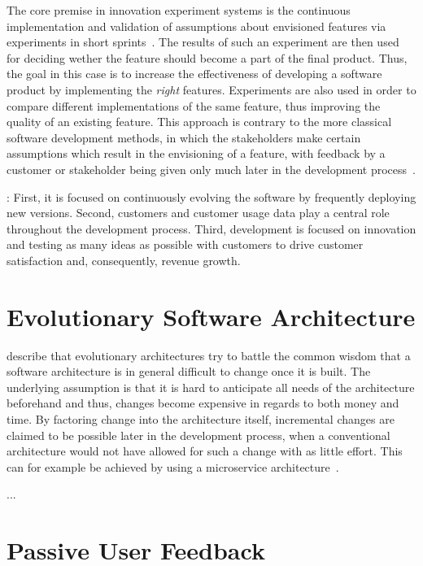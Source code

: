The core premise in innovation experiment systems is the continuous implementation and validation of assumptions about envisioned features via experiments in short sprints~\cite{Bosch2014}.
The results of such an experiment are then used for deciding wether the feature should become a part of the final product.
Thus, the goal in this case is to increase the effectiveness of developing a software product by implementing the \emph{right} features.
Experiments are also used in order to compare different implementations of the same feature, thus improving the quality of an existing feature.
This approach is contrary to the more classical software development methods, in which the stakeholders make certain assumptions which result in the envisioning of a feature, with feedback by a customer or stakeholder being given only much later in the development process~\cite{Bosch2012}.

\cite{Bosch2012}: First, it is focused on continuously evolving the software by frequently deploying new versions. Second, customers and customer usage data play a central role throughout the development process. Third, development is focused on innovation and testing as many ideas as possible with customers to drive customer satisfaction and, consequently, revenue growth.


\section{Evolutionary Software Architecture}
\label{sec:fundamentals:evolutionary}

\citet{ford2017building} describe that evolutionary architectures try to battle the common wisdom that a software architecture is in general difficult to change once it is built.
The underlying assumption is that it is hard to anticipate all needs of the architecture beforehand and thus, changes become expensive in regards to both money and time.
By factoring change into the architecture itself, incremental changes are claimed to be possible later in the development process, when a conventional architecture would not have allowed for such a change with as little effort.
This can for example be achieved by using a microservice architecture~\cite{WEB:EvolArch:2016}.

...

\section{Passive User Feedback}
\label{sec:fundamentals:implicit}

